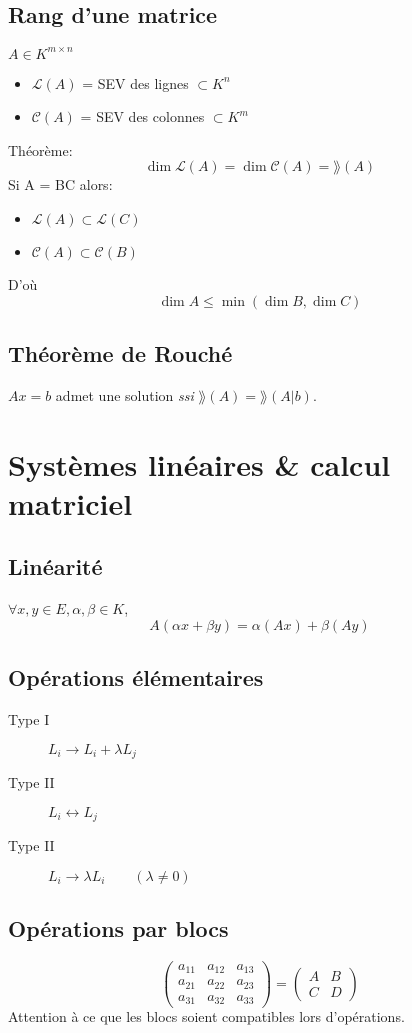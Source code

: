 \subsection{Rang d'une matrice}
$A \in K^{m\times{n}}$\\
\begin{itemize}
\item $\mathcal{L}(A)$ = SEV des lignes $\subset K^n$\\
\item $\mathcal{C}(A)$ = SEV des colonnes $\subset K^m$\\
\end{itemize}
Théorème:
\[\dim\mathcal{L}(A) = \dim\mathcal{C}(A) = \rang(A)\]
Si A = BC alors:
\begin{itemize}
\item $\mathcal{L}(A) \subset \mathcal{L}(C)$
\item $\mathcal{C}(A) \subset \mathcal{C}(B)$
\end{itemize}
D'où
$$\dim A \leq \min(\dim B, \dim C)$$
\subsection{Théorème de Rouché}
$Ax = b$ admet une solution \emph{ssi} $\rang(A) = \rang(A | b)$.


\section{Systèmes linéaires \& calcul matriciel}

\subsection{Linéarité}
$\forall x,y \in{E}, \alpha, \beta \in{K}$,
\[ A(\alpha{x} + \beta{y}) = \alpha{(Ax)} + \beta{(Ay)}\]
\subsection{Opérations élémentaires}
\begin{description}
\item[Type I] $L_i \rightarrow L_i + \lambda{L_j}$
\item[Type II] $L_i \leftrightarrow L_j$
\item[Type II] $L_i \rightarrow \lambda{L_i} \qquad{(\lambda \neq 0)}$
\end{description}
\subsection{Opérations par blocs}
\[
\left(
\begin{array}{cc|c}
   a_{11} & a_{12} & a_{13} \\
   \hline
   a_{21} & a_{22} & a_{23} \\
   a_{31} & a_{32} & a_{33} 
\end{array}
\right)
= \begin{pmatrix}
	A&B \\
	C&D
\end{pmatrix}
\]
Attention à ce que les blocs soient compatibles lors d'opérations.

